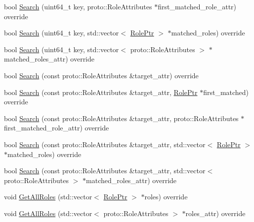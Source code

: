 \begin{DoxyCompactItemize}
\item 
bool \hyperlink{classapollo_1_1cyber_1_1service__discovery_1_1SingleValueWarehouse_a58879018d2513d8e85cad19d92a5e5ed}{Search} (uint64\-\_\-t key, proto\-::\-Role\-Attributes $\ast$first\-\_\-matched\-\_\-role\-\_\-attr) override
\item 
bool \hyperlink{classapollo_1_1cyber_1_1service__discovery_1_1SingleValueWarehouse_ab64472d056003f1bb7ea6a96a3f115ca}{Search} (uint64\-\_\-t key, std\-::vector$<$ \hyperlink{namespaceapollo_1_1cyber_1_1service__discovery_a47c65bbb4b41d9ae41bfbd33271df525}{Role\-Ptr} $>$ $\ast$matched\-\_\-roles) override
\item 
bool \hyperlink{classapollo_1_1cyber_1_1service__discovery_1_1SingleValueWarehouse_ab727e65a8d75a38a56d10b898aa633f5}{Search} (uint64\-\_\-t key, std\-::vector$<$ proto\-::\-Role\-Attributes $>$ $\ast$matched\-\_\-roles\-\_\-attr) override
\item 
bool \hyperlink{classapollo_1_1cyber_1_1service__discovery_1_1SingleValueWarehouse_a532c886612829b9d8bb623b2b7961405}{Search} (const proto\-::\-Role\-Attributes \&target\-\_\-attr) override
\item 
bool \hyperlink{classapollo_1_1cyber_1_1service__discovery_1_1SingleValueWarehouse_a223ca0ff029dc11708d0e648330c729d}{Search} (const proto\-::\-Role\-Attributes \&target\-\_\-attr, \hyperlink{namespaceapollo_1_1cyber_1_1service__discovery_a47c65bbb4b41d9ae41bfbd33271df525}{Role\-Ptr} $\ast$first\-\_\-matched) override
\item 
bool \hyperlink{classapollo_1_1cyber_1_1service__discovery_1_1SingleValueWarehouse_a3d23da2236b20005846864eef17e5b13}{Search} (const proto\-::\-Role\-Attributes \&target\-\_\-attr, proto\-::\-Role\-Attributes $\ast$first\-\_\-matched\-\_\-role\-\_\-attr) override
\item 
bool \hyperlink{classapollo_1_1cyber_1_1service__discovery_1_1SingleValueWarehouse_aceb378eb3eb2e427c7c819f92b3de84c}{Search} (const proto\-::\-Role\-Attributes \&target\-\_\-attr, std\-::vector$<$ \hyperlink{namespaceapollo_1_1cyber_1_1service__discovery_a47c65bbb4b41d9ae41bfbd33271df525}{Role\-Ptr} $>$ $\ast$matched\-\_\-roles) override
\item 
bool \hyperlink{classapollo_1_1cyber_1_1service__discovery_1_1SingleValueWarehouse_a49c7255d5c08ec2777bc97b359929f3b}{Search} (const proto\-::\-Role\-Attributes \&target\-\_\-attr, std\-::vector$<$ proto\-::\-Role\-Attributes $>$ $\ast$matched\-\_\-roles\-\_\-attr) override
\item 
void \hyperlink{classapollo_1_1cyber_1_1service__discovery_1_1SingleValueWarehouse_a59aa8bb02d604c3c3ba6568dcfc820f9}{Get\-All\-Roles} (std\-::vector$<$ \hyperlink{namespaceapollo_1_1cyber_1_1service__discovery_a47c65bbb4b41d9ae41bfbd33271df525}{Role\-Ptr} $>$ $\ast$roles) override
\item 
void \hyperlink{classapollo_1_1cyber_1_1service__discovery_1_1SingleValueWarehouse_a9d860bc1d7bdd0fe8e2167ef3d94e00e}{Get\-All\-Roles} (std\-::vector$<$ proto\-::\-Role\-Attributes $>$ $\ast$roles\-\_\-attr) override
\end{DoxyCompactItemize}
